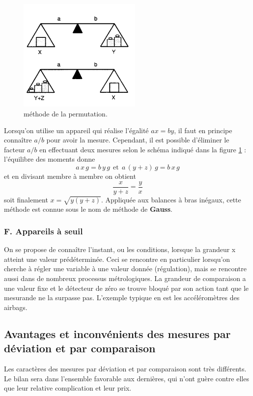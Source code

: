 \begin{figure}
   \vspace{-2cm}
   \centering
   \includegraphics[width=6cm]{assets/figures/perm.pdf}
   \caption{méthode de la permutation.}
   \label{fig:perm}
\end{figure}
Lorsqu'on utilise un appareil qui réalise l'égalité $ax=by$, il faut en principe connaître $a/b$ pour avoir la mesure. Cependant, il est possible d'éliminer le facteur $a/b$ en effectuant deux mesures selon le schéma indiqué dans la figure \ref{fig:perm} : l'équilibre des moments donne
$$
a\,x\,g=b\,y\,g\ \ \text{et}\ \ a\,(y+z)\,g=b\,x\,g
$$
et en divisant membre à membre on obtient
$$
\frac{x}{y+z}=\frac{y}{x}
$$
soit finalement $x=\sqrt{y(y+z)}$. Appliquée aux balances à bras inégaux, cette méthode est connue sous le nom de méthode de \textbf{Gauss}.

\subsubsection{F. Appareils à seuil}

On se propose de connaître l'instant, ou les conditions, lorsque la grandeur x atteint une valeur prédéterminée. Ceci se rencontre en particulier lorsqu'on cherche à régler une variable à une valeur donnée (régulation), mais se rencontre aussi dans de nombreux processus métrologiques. La grandeur de comparaison a une valeur fixe et le détecteur de zéro se trouve bloqué par son action tant que le mesurande ne la surpasse pas. L'exemple typique en est les accéléromètres des airbags.

\subsection{Avantages et inconvénients des mesures par déviation et par comparaison}

Les caractères des mesures par déviation et par comparaison sont très différents. Le bilan sera dans l'ensemble favorable aux dernières, qui n'ont guère contre elles que leur relative complication et leur prix.

